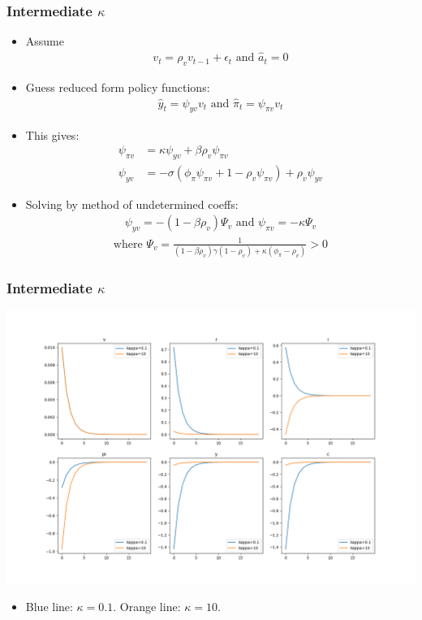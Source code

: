 \documentclass[english,xcolor=svgnames]{beamer}
\begin{document}
\begin{frame}
\frametitle{Intermediate $\kappa$}
\begin{itemize}
	\item Assume
	\begin{align*}
		v_t = \rho_v v_{t-1}+\epsilon_t \text{ and }\hat{a}_{t}=0
	\end{align*}
	\item Guess reduced form policy functions:
	\begin{align*}
		\hat{y}_t=\psi_{yv}v_t\text{ and }\hat{\pi}_t=\psi_{\pi v}v_t
	\end{align*}
	\item This gives:
	\begin{align*}
		\psi_{\pi v}&=\kappa\psi_{yv}+\beta\rho_v\psi_{\pi v}\\
		\psi_{y v}&=-\sigma(\phi_\pi \psi_{\pi v} + 1 -\rho_v \psi_{\pi v})+\rho_v \psi_{y v}
	\end{align*}
	\item Solving by method of undetermined coeffs:
	\begin{align*}
		\psi_{y v}=-(1-\beta\rho_v)\Psi_v\text{ and }\psi_{\pi v}=-\kappa \Psi_v
	\end{align*}
	\begin{align*}
		\text{where } \Psi_v=\frac{1}{(1-\beta\rho_v)\gamma(1-\rho_v)+\kappa(\phi_\pi-\rho_v)}>0
	\end{align*}
\end{itemize}
\end{frame}

\begin{frame}
\frametitle{Intermediate $\kappa$}
\centering
\includegraphics[scale=0.3]{nklinearirf.png}
\begin{itemize}
	\item Blue line: $\kappa = 0.1$. Orange line: $\kappa = 10$.
\end{itemize}
\end{frame}
\end{document}
